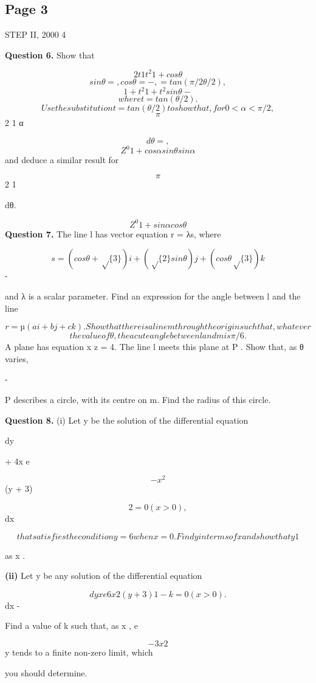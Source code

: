 \documentclass[12pt]{article}
\begin{document}
\subsection*{Page 3}
\begin{flushleft}
STEP II, 2000 4\par
\bigskip\textbf{Question 6.} Show that\par
\[2t 1 t^2 1 + cos θ\]
\[sin θ = , cos θ = - , = tan(\pi/2 θ/2),\]
\[1 + t^2 1 + t^2 sin θ -\]
\[where t = tan(θ/2).\]
\[Use the substitution t = tan(θ/2) to show that, for 0 < α < \pi/2,\]
\[\pi\]
2 1 α\par
\[dθ = ,\]
\[Z^0 1 + cos α sin θ sin α\]
and deduce a similar result for\par
\[\pi\]
2 1\par
dθ.\par
\[Z^0 1 + sin α cos θ\]
\bigskip\textbf{Question 7.} The line l has vector equation r = λs, where\par
\[s = (cos θ + \sqrt\{3\} ) i + (\sqrt\{2\} sin θ) j + (cos θ \sqrt\{3\} ) k\]
-\par
and λ is a scalar parameter. Find an expression for the angle between l and the line\par
\[r = µ(a i + b j + c k). Show that there is a line m through the origin such that, whatever\]
\[the value of θ, the acute angle between l and m is \pi/6.\]
A plane has equation x z = 4. The line l meets this plane at P . Show that, as θ varies,\par
-\par
P describes a circle, with its centre on m. Find the radius of this circle.\par
\bigskip\textbf{Question 8.} (i) Let y be the solution of the differential equation\par
dy\par
+ 4x e\par
\[-x^2\]
(y + 3)\par
\[2 = 0 (x > 0),\]
dx\par
\[that satisfies the condition y = 6 when x = 0. Find y in terms of x and show that y 1\]
\to\par
as x .\par
\to \infty\par
\textbf{(ii)} Let y be any solution of the differential equation\par
\[dy x e 6x2 (y + 3) 1-k = 0 (x > 0).\]
dx -\par
Find a value of k such that, as x , e\par
\[-3x2\]
y tends to a finite non-zero limit, which\par
\to \infty\par
you should determine.\par
\end{flushleft}
\end{document}
